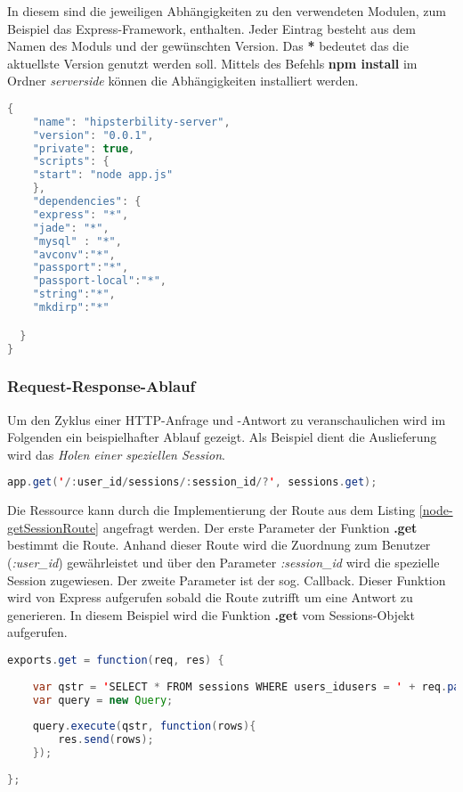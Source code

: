 In diesem sind die jeweiligen Abhängigkeiten zu den verwendeten Modulen, zum Beispiel das Express-Framework, enthalten. Jeder Eintrag besteht aus dem Namen des Moduls und der gewünschten Version. Das \textbf{*} bedeutet das die aktuellste Version genutzt werden soll. Mittels des Befehls \textbf{npm install} im Ordner \textit{serverside} können die Abhängigkeiten installiert werden. 

\begin{lstlisting}[label=node-packages,language=Java, caption=Abhängigkeiten der Node-Anwendung]
{
    "name": "hipsterbility-server",
    "version": "0.0.1",
    "private": true,
    "scripts": {
    "start": "node app.js"
    },
    "dependencies": {
    "express": "*",
	"jade": "*",
	"mysql" : "*",
    "avconv":"*",
    "passport":"*",
    "passport-local":"*",
    "string":"*",
    "mkdirp":"*"

  }
}
\end{lstlisting}

\subsubsection{Request-Response-Ablauf \label{sec:req-res-cycle}}

Um den Zyklus einer HTTP-Anfrage und -Antwort zu veranschaulichen wird im Folgenden ein beispielhafter Ablauf gezeigt. Als Beispiel dient die Auslieferung wird das \emph{Holen einer speziellen Session}.  

\begin{lstlisting}[label=node-getSessionRoute,language=Java, caption=Routenlistener für eine spezielle Session, firstnumber=169] 
app.get('/:user_id/sessions/:session_id/?', sessions.get);
\end{lstlisting}

Die Ressource kann durch die Implementierung der Route aus dem Listing \ref{node-getSessionRoute} angefragt werden. Der erste Parameter der Funktion \textbf{.get} bestimmt die Route. Anhand dieser Route wird die Zuordnung zum Benutzer (\emph{:user\_id}) gewährleistet und über den Parameter \emph{:session\_id} wird die spezielle Session zugewiesen. Der zweite Parameter ist der sog. Callback. Dieser Funktion wird von Express aufgerufen sobald die Route zutrifft um eine Antwort zu generieren. In diesem Beispiel wird die Funktion \textbf{.get} vom Sessions-Objekt aufgerufen.

\begin{lstlisting}[label=node-getSessionHandler,language=Java, caption=Routenbehandlung für eine spezielle Session, firstnumber=29]
exports.get = function(req, res) {
	
	var qstr = 'SELECT * FROM sessions WHERE users_idusers = ' + req.params.user_id + ' AND idsessions = ' + req.params.session_id;
	var query = new Query;
	
	query.execute(qstr, function(rows){
		res.send(rows);
	});
	
};
\end{lstlisting}

